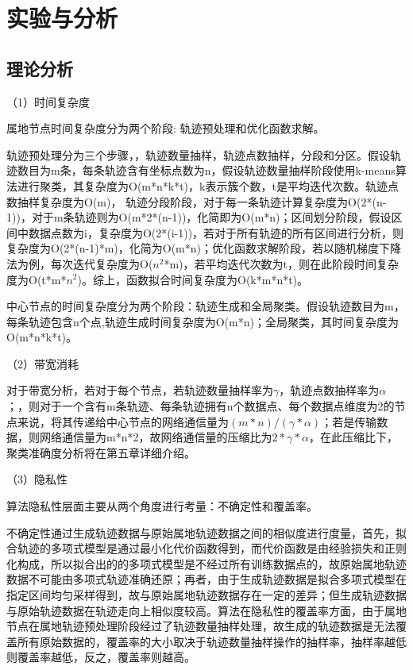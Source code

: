 \section{实验与分析}

\subsection{理论分析}

（1）时间复杂度

属地节点时间复杂度分为两个阶段: 轨迹预处理和优化函数求解。

轨迹预处理分为三个步骤，，轨迹数量抽样，轨迹点数抽样，分段和分区。假设轨迹数目为m条，每条轨迹含有坐标点数为n，假设轨迹数量抽样阶段使用k-means算法进行聚类，其复杂度为O(m*n*k*t)，k表示簇个数，t是平均迭代次数。轨迹点数抽样复杂度为O(m)，
轨迹分段阶段，对于每一条轨迹计算复杂度为O(2*(n-1))，对于m条轨迹则为O(m*2*(n-1))，化简即为O(m*n)；区间划分阶段，假设区间中数据点数为i，复杂度为O(2*(i-1))，若对于所有轨迹的所有区间进行分析，则复杂度为O(2*(n-1)*m)，化简为O(m*n)；优化函数求解阶段，若以随机梯度下降法为例，每次迭代复杂度为O($n^2$*m)，若平均迭代次数为t，则在此阶段时间复杂度为O(t*m*$n^2$)。综上，函数拟合时间复杂度为O(k*m*n*t)。

中心节点的时间复杂度分为两个阶段：轨迹生成和全局聚类。假设轨迹数目为m，每条轨迹包含n个点,轨迹生成时间复杂度为O(m*n)；全局聚类，其时间复杂度为O(m*n*k*t)。

（2）带宽消耗

对于带宽分析，若对于每个节点，若轨迹数量抽样率为$\gamma$，轨迹点数抽样率为$\alpha$；，则对于一个含有m条轨迹、每条轨迹拥有n个数据点、每个数据点维度为2的节点来说，将其传递给中心节点的网络通信量为$(m*n)/(\gamma*\alpha)$；若是传输数据，则网络通信量为m*n*2，故网络通信量的压缩比为$2*\gamma*\alpha$，在此压缩比下，聚类准确度分析将在第五章详细介绍。

（3）隐私性

算法隐私性层面主要从两个角度进行考量：不确定性和覆盖率。

不确定性通过生成轨迹数据与原始属地轨迹数据之间的相似度进行度量，首先，拟合轨迹的多项式模型是通过最小化代价函数得到，而代价函数是由经验损失和正则化构成，所以拟合出的的多项式模型是不经过所有训练数据点的，故原始属地轨迹数据不可能由多项式轨迹准确还原；再者，由于生成轨迹数据是拟合多项式模型在指定区间均匀采样得到，故与原始属地轨迹数据存在一定的差异；但生成轨迹数据与原始轨迹数据在轨迹走向上相似度较高。算法在隐私性的覆盖率方面，由于属地节点在属地轨迹预处理阶段经过了轨迹数量抽样处理，故生成的轨迹数据是无法覆盖所有原始数据的，覆盖率的大小取决于轨迹数量抽样操作的抽样率，抽样率越低则覆盖率越低，反之，覆盖率则越高。

